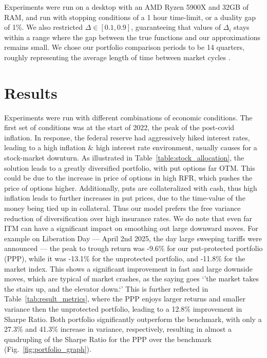\documentclass[11pt]{article}
\begin{document}
Experiments were run on a desktop with an AMD Ryzen 5900X and 32GB of RAM, and run with stopping conditions of a 1 hour time-limit, or a duality gap of 1\%. We also restricted $\Delta \in [0.1, 0.9]$, guaranteeing that values of $\Delta_i$ stays within a range where the gap between the true functions and our approximations remains small. We chose our portfolio comparison periods to be 14 quarters, roughly representing the average length of time between market cycles \citep{bearmarkets}.

\section{Results}

Experiments were run with different combinations of economic conditions. The first set of conditions was at the start of 2022, the peak of the post-covid inflation. In response, the federal reserve had aggressively hiked interest rates, leading to a high inflation \& high interest rate environment, usually causes for a stock-market downturn. As illustrated in Table~\ref{table:stock_allocation}, the solution leads to a greatly diversified portfolio, with put options far OTM. This could be due to the increase in price of options in high RFR, which pushes the price of options higher. Additionally, puts are collateralized with cash, thus high inflation leads to further increases in put prices, due to the time-value of the money being tied up in collateral. Thus our model prefers the free variance reduction of diversification over high insurance rates. We do note that even far ITM can have a significant impact on smoothing out large downward moves. For example on Liberation Day --- April 2nd 2025, the day large sweeping tariffs were announced --- the peak to trough return was -9.6\% for our put-protected portfolio (PPP), while it was -13.1\% for the unprotected portfolio, and -11.8\% for the market index. This shows a significant improvement in fast and large downside moves, which are typical of market crashes, as the saying goes `'the market takes the stairs up, and the elevator down.`' This is further reflected in Table~\ref{tab:result_metrics}, where the PPP enjoys larger returns and smaller variance then the unprotected portfolio, leading to a 12.8\% improvement in Sharpe Ratio. Both portfolio significantly outperform the benchmark, with only a 27.3\% and 41.3\% increase in variance, respectively, resulting in almost a quadrupling of the Sharpe Ratio for the PPP over the benchmark (Fig.~\ref{fig:portfolio_graph}).
\end{document}
